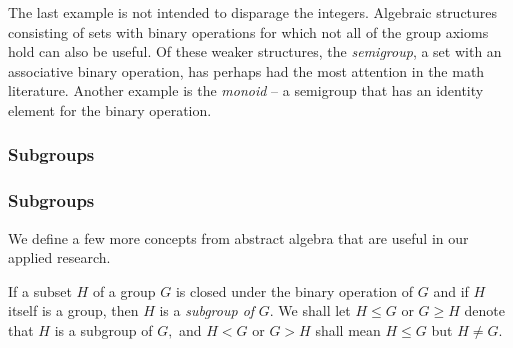 The last example is not intended to disparage the integers. Algebraic
structures consisting of sets with binary operations for 
which not all of the group axioms hold can also be useful.  Of these
weaker structures, the \emph{semigroup}, a set with an associative binary
operation, has perhaps had the most attention in the math literature.  Another
example is the \emph{monoid} -- a semigroup that has an identity element for
the binary operation. 
%

{\subsubsection{Subgroups}}
{\subsubsection{Subgroups\protect\footnotemark}
}
We define a few more concepts from abstract algebra that are useful in our
applied research.
\begin{definition}[Subgroup]
If a subset $H$ of a group $G$ is closed under the binary operation of
$G$ and if $H$ itself is a group, then $H$ is a \emph{subgroup of}
$G.$  We shall let $H \leq G$ or $G\geq H$ denote that $H$ is a
subgroup of $G,$ and $H < G$ or $G> H$ shall mean $H \leq G$ but $H
\neq G.$
\end{definition}

